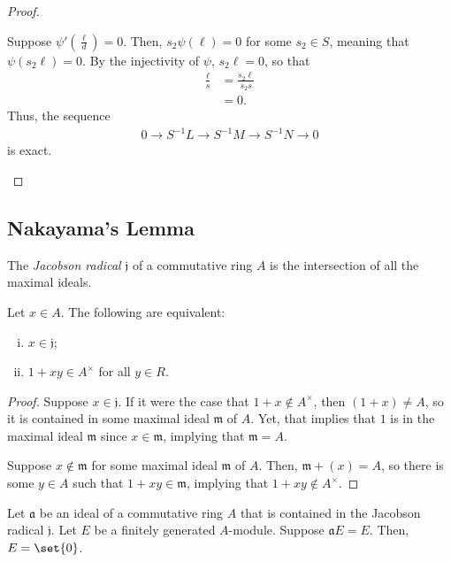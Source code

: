 \documentclass[10pt]{mypackage}
\begin{document}
\begin{proof}
\begin{enumerate}[(i)]
      Suppose $\psi'\left( \frac{\ell}{d} \right) = 0$. Then, $s_2\psi(\ell) = 0$ for some $s_2\in S$, meaning that $\psi\left( s_2\ell \right) = 0$. By the injectivity of $\psi$, $s_2\ell = 0$, so that
      \begin{align*}
        \frac{\ell}{s} &= \frac{s_2\ell}{s_2s}\\
                       &= 0.
      \end{align*}
      Thus, the sequence
      \begin{align*}
        0\rightarrow S^{-1}L\rightarrow S^{-1}M\rightarrow S^{-1}N \rightarrow 0
      \end{align*}
      is exact.
  \end{enumerate}
\end{proof}
\subsection{Nakayama's Lemma}%
\begin{definition}
  The \textit{Jacobson radical} $ \mathfrak{j} $ of a commutative ring $A$ is the intersection of all the maximal ideals.
\end{definition}
\begin{lemma}
  Let $x\in A$. The following are equivalent:
  \begin{enumerate}[(i)]
    \item $x\in \mathfrak{j} $;
    \item $1 + xy\in A^{\times}$ for all $y\in R$.
  \end{enumerate}
\end{lemma}
\begin{proof}
  Suppose $x\in \mathfrak{j}$. If it were the case that $1+ x\notin A^{\times}$, then $ \left( 1 + x \right)\neq A $, so it is contained in some maximal ideal $ \mathfrak{m} $ of $A$. Yet, that implies that $1$ is in the maximal ideal $ \mathfrak{m} $ since $x\in \mathfrak{m}$, implying that $ \mathfrak{m} = A $.

  Suppose $x\notin \mathfrak{m}$ for some maximal ideal $ \mathfrak{m} $ of $A$. Then, $ \mathfrak{m} + \left( x \right) = A $, so there is some $y\in A$ such that $1 + xy\in \mathfrak{m}$, implying that $1 + xy\notin A^{\times}$.
\end{proof}
\begin{lemma}
  Let $ \mathfrak{a} $ be an ideal of a commutative ring $A$ that is contained in the Jacobson radical $ \mathfrak{j} $. Let $E$ be a finitely generated $A$-module. Suppose $ \mathfrak{a}E = E $. Then, $E = \set{0}$.
\end{lemma}
\end{document}
